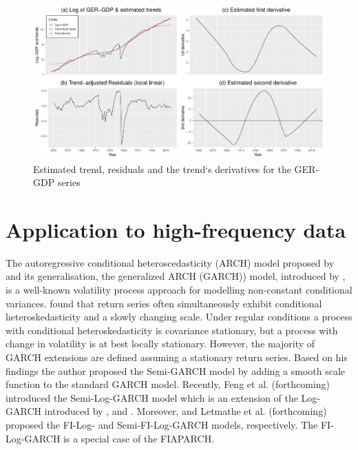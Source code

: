 \documentclass[12pt]{article}
\begin{document}
\begin{figure}[h!]
	\includegraphics[trim = {0cm 0mm 0mm 0mm}, width = \textwidth]{Abb/GERgdp.pdf}
	\caption{Estimated trend, residuals and the trend`s derivatives for the GER-GDP series}
\end{figure}


\section{Application to high-frequency data}
The autoregressive conditional heteroscedasticity (ARCH) model proposed by \citet{engle1982autoregressive} and its generalisation, the generalized ARCH (GARCH)) model, introduced by \citet{bollerslev1986generalized} , is a well-known volatility process approach for modelling non-constant conditional variances. \citet{feng2004simultaneously} found that return series often simultaneously exhibit conditional heteroskedasticity and a slowly changing scale. Under regular conditions a process with conditional heteroskedasticity is covariance stationary, but a process with change in volatility is at best locally stationary. However, the majority of GARCH extensions are defined assuming a stationary return series. Based on his findings the author proposed the Semi-GARCH model by adding a smooth scale function to the standard GARCH model. Recently, Feng et al. (forthcoming) introduced the Semi-Log-GARCH model which is an extension of the Log-GARCH introduced by \citet{pantula1986modeling}, \citet{geweke1986comment} and \citet{milhoj1987conditional}. Moreover, \citet{feng2020fractionally} and Letmathe et al. (forthcoming) proposed the FI-Log- and Semi-FI-Log-GARCH models, respectively. The FI-Log-GARCH is a special case of the FIAPARCH.
\end{document}
